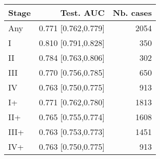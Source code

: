 \begin{table}[ht]
\centering
\begin{tabular}{lrr}
  \toprule
Stage & Test. AUC & Nb. cases \\ 
  \midrule
Any & 0.771 [0.762,0.779] & 2054 \\ 
   \addlinespace
I & 0.810 [0.791,0.828] & 350 \\ 
  II & 0.784 [0.763,0.806] & 302 \\ 
  III & 0.770 [0.756,0.785] & 650 \\ 
  IV & 0.763 [0.750,0.775] & 913 \\ 
   \addlinespace
I+ & 0.771 [0.762,0.780] & 1813 \\ 
  II+ & 0.765 [0.755,0.774] & 1608 \\ 
  III+ & 0.763 [0.753,0.773] & 1451 \\ 
  IV+ & 0.763 [0.750,0.775] & 913 \\ 
   \bottomrule
\end{tabular}
\end{table}
